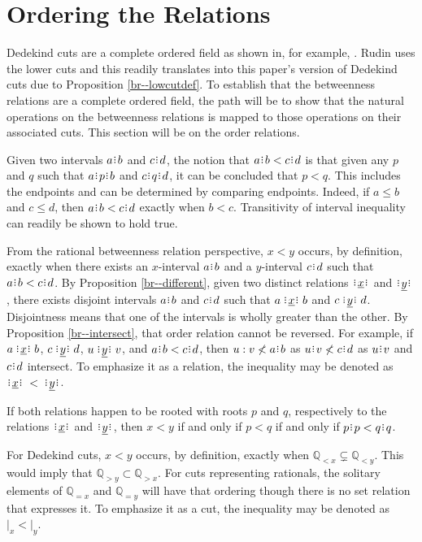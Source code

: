 \documentclass[12pt]{article}
\newcommand{\qcut}[2][x]{\ensuremath{\mathbb{Q}_{#2 #1}}}
\newcommand{\qlt}[1][x]{\qcut[#1]{<}}
\newcommand{\qeq}[1][x]{\qcut[#1]{=}}
\newcommand{\qgt}[1][x]{\qcut[#1]{>}}
\newcommand{\cut}[1][x]{{\vert}_{#1} }
\newcommand{\yrel}{\xrel[y]}
\begin{document}
\section{Ordering the Relations}

Dedekind cuts are a complete ordered field as shown in, for example, \cite{rudin}. Rudin uses the lower cuts and this readily translates into this paper's version of Dedekind cuts due to Proposition \ref{br--lowcutdef}. To establish that  the betweenness relations are a complete ordered field, the path will be to show that the natural operations on the betweenness relations is mapped to those operations on their associated cuts. This section will be on the order relations.  

Given two intervals $a \rint b$ and $c\rint d$, the notion that $a \rint b < c\rint d$ is that given any $p$ and $q$ such that $a\rint p\rint b$ and $c\rint q\rint d$, it can be concluded that $p < q$. This includes the endpoints and can be determined by comparing endpoints. Indeed, if $a\leq b$ and $c \leq d$, then $a \rint b < c\rint d$ exactly when $b < c$. Transitivity of interval inequality can readily be shown to hold true. 

From the rational betweenness relation perspective, $x < y$ occurs, by definition, exactly when there exists an $x$-interval $a \rint b$ and a $y$-interval $c\rint d$ such that $a \rint b < c\rint d$. By Proposition \ref{br--different}, given two distinct relations $\xrel$ and $\yrel$, there exists disjoint intervals $a \rint b$ and $c\rint d$ such that $a \xrel b$ and $c \yrel d$. Disjointness means that one of the intervals is wholly greater than the other. By Proposition \ref{br--intersect}, that order relation cannot be reversed. For example, if $a \xrel b$, $c \xrel[y] d$, $u \yrel v$, and $a \rint b < c\rint d$, then $u:v \nless a \rint b$ as $u\rint v \nless c\rint d$ as $u\rint v$ and $c\rint d$ intersect.  To emphasize it as a relation, the inequality may be denoted as $\xrel  \:<\: \yrel$. 

If both relations happen to be  rooted with roots $p$ and $q$, respectively to the relations $\xrel$ and $\yrel$, then $x<y$ if and only if $p < q$ if and only if $p\rint p < q\rint q$. 

For Dedekind cuts, $x < y$ occurs, by definition, exactly when $\qlt \subsetneq \qlt[y]$. This would imply that $\qgt[y] \subset \qgt$. For cuts representing rationals, the solitary elements of $\qeq$ and $\qeq[y]$ will have that ordering though there is no set relation that expresses it. To emphasize it as a cut, the inequality may be denoted as $\cut < \cut[y]$.
\end{document}
